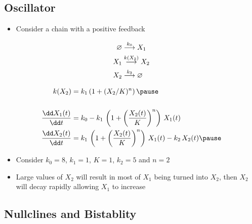 \begin{slide}
\section[-2]{Oscillator}

\begin{PauseHighLight}
  \begin{itemize}
  \item Consider a chain with a positive feedback
  \end{itemize}\vspace*{-1cm}
\begin{minipage}[t]{0.28\linewidth}
  \begin{align*}
    \varnothing &\stackrel{k_0}{\longrightarrow} X_1 \\
    X_1 &\stackrel{k(X_2)}{\longrightarrow} X_2 \\
    X_2 &\stackrel{k_2}{\longrightarrow} \varnothing
  \end{align*}
\end{minipage}\hfil
\begin{minipage}[t]{0.68\linewidth}
  {\small \begin{align*}
            k(X_2) &= k_1\left(1+ (X_2/K)^n\right)\pause\\
            \\
    \frac{\dd X_1(t)}{\dd t} &= k_0 -
       k_1\,\left(1+\left(\frac{X_2(t)}{K}\right)^n\right)\,X_1(t) \\
    \frac{\dd X_2(t)}{\dd t} &=
       k_1\,\left(1+\left(\frac{X_2(t)}{K}\right)^n\right)\,X_1(t) -k_2\,X_2(t)\pause
  \end{align*}}
\end{minipage}
\begin{itemize}
\item Consider $k_0=8$, $k_1=1$, $K=1$, $k_2=5$ and $n=2$\pause
\item Large values of $X_2$ will result in most of $X_1$ being turned
  into $X_2$, then $X_2$ will decay rapidly allowing $X_1$ to increase\pause
\end{itemize}
\end{PauseHighLight}

\end{slide}

\begin{slide}
\section[-2]{Nullclines and Bistablity}

\pause
\pb {}
\begin{center}
  \pause
\end{center}
\end{slide}

